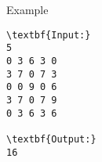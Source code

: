 Example
\begin{verbatim}
\textbf{Input:}
5
0 3 6 3 0 
3 7 0 7 3 
0 0 9 0 6 
3 7 0 7 9 
0 3 6 3 6

\textbf{Output:}
16
\end{verbatim}